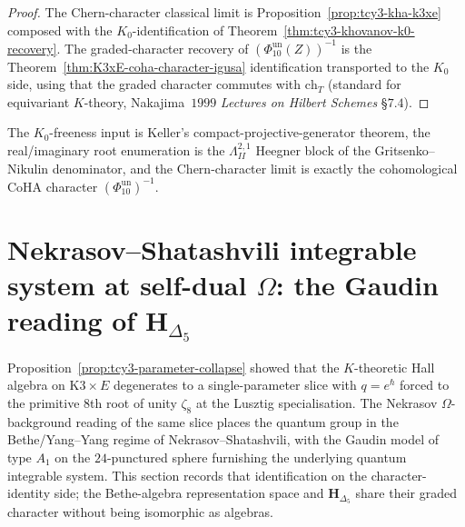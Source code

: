 \begin{proof}
The Chern-character classical limit is Proposition~\ref{prop:tcy3-kha-k3xe}
composed with the $K_0$-identification of
Theorem~\ref{thm:tcy3-khovanov-k0-recovery}. The graded-character
recovery of \((\Phi_{10}^{\mathrm{un}}(Z))^{-1}\) is the Theorem~\ref{thm:K3xE-coha-character-igusa}
identification transported to the $K_0$ side, using that the graded
character commutes with $\mathrm{ch}_T$ (standard for equivariant
$K$-theory, Nakajima~$1999$ \emph{Lectures on Hilbert Schemes} \S $7.4$).
\end{proof}

\noindent The \(K_0\)-freeness input is Keller's compact-projective-generator
theorem, the real/imaginary root enumeration is the
\(\Lambda^{2,1}_{II}\) Heegner block of the Gritsenko--Nikulin
denominator, and the Chern-character limit is exactly the
cohomological CoHA character
\((\Phi_{10}^{\mathrm{un}})^{-1}\).

\section{Nekrasov--Shatashvili integrable system at self-dual
\texorpdfstring{$\Omega$}{Omega}: the Gaudin reading of \texorpdfstring{$\mathbf H_{\Delta_5}$}{H-Delta-5}}
\label{sec:tcy3-nekrasov-ns-self-dual}

Proposition~\ref{prop:tcy3-parameter-collapse} showed that the
$K$-theoretic Hall algebra on $\mathrm{K3}\times E$ degenerates to
a single-parameter slice with $q = e^\hbar$ forced to the primitive
$8$th root of unity $\zeta_8$ at the Lusztig specialisation. The
Nekrasov $\Omega$-background reading of the same slice places
the quantum group in the Bethe/Yang--Yang regime of
Nekrasov--Shatashvili, with the Gaudin model of type $A_1$ on the
$24$-punctured sphere furnishing the underlying quantum integrable
system. This section records that identification on the
character-identity side; the Bethe-algebra representation space and
$\mathbf H_{\Delta_5}$ share their graded character without being
isomorphic as algebras.

